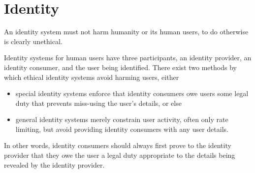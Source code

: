 
\section{Identity}









An identity system must not harm humanity or its human users, to do otherwise is clearly unethical.  

Identity systems for human users have three participants, an identity provider, an identity consumer, and the user being identified.  There exist two methods by which ethical identity systems avoid harming users, either 
\begin{itemize}
\item special identity systems enforce that identity consumers owe users some legal duty that prevents miss-using the user's details, or else
\item general identity systems merely constrain user activity, often only rate limiting, but avoid providing identity consumers with any user details.
\end{itemize}
In other words, identity consumers should always first prove to the identity provider that they owe the user a legal duty appropriate to the details being revealed by the identity provider.

